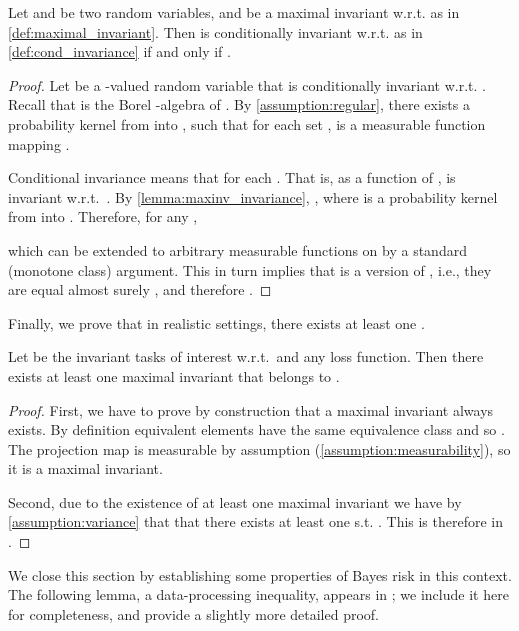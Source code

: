 \documentclass[final]{article}
\begin{document}
\begin{lemma}\label{lemma:desintegration}
Let  and  be two random variables, and  be a maximal invariant w.r.t.  as in \cref{def:maximal_invariant}.
Then  is conditionally invariant w.r.t.  as in \cref{def:cond_invariance} if and only if .
\end{lemma}
\begin{proof}
Let  be a -valued random variable that is conditionally invariant w.r.t. . Recall that  is the Borel -algebra of . 
By \cref{assumption:regular}, there exists a probability kernel  from  into , such that for each set  ,  is a measurable function mapping .

Conditional invariance means that  for each . 
That is, as a function of ,  is invariant w.r.t.\ . 
By \cref{lemma:maxinv_invariance}, , where  is a probability kernel from  into . Therefore, for any ,

which can be extended to arbitrary measurable functions on  by a standard (monotone class) argument. This in turn implies that  is a version of , i.e., they are equal almost surely , and therefore .
\end{proof}

Finally, we prove that in realistic settings, there exists at least one .
\begin{lemma}\label{lemma:one_Mx_is_task}
Let  be the invariant tasks of interest w.r.t.\   and any loss function.  
Then there exists at least one maximal invariant that belongs to .
\end{lemma}
\begin{proof}
First, we have to prove by construction that a maximal invariant always exists. 
By definition equivalent elements have the same equivalence class and so . The projection map is measurable by assumption (\cref{assumption:measurability}), so it is a maximal invariant.

Second, due to the existence of at least one maximal invariant  we have by \cref{assumption:variance} that that there exists at least one  s.t. .
This  is therefore in .

\end{proof}

We close this section by establishing some properties of Bayes risk in this context. The following lemma, a data-processing inequality, appears in \citet{xu_minimum_2020}; we include it here for completeness, and provide a slightly more detailed proof.
\end{document}
